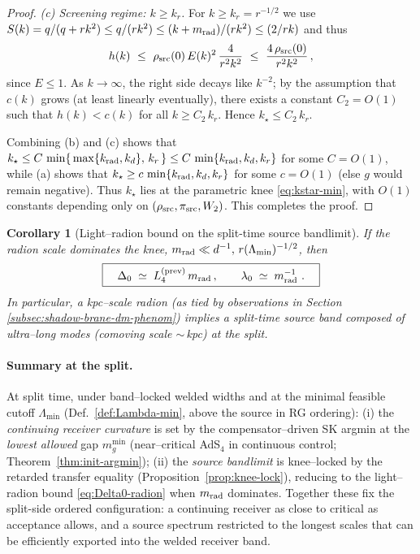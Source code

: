 \documentclass[10pt]{article}
\theoremstyle{definition}
\theoremstyle{plain}
\newtheorem{corollary}{Corollary}[section]
\begin{document}
\begin{proof}
\smallskip
\noindent\emph{(c) Screening regime: $k\ge k_r$.}
For $k\ge k_r=r^{-1/2}$ we use $S(k)=q/(q+rk^2)\le q/(rk^2)\le (k+m_{\rm rad})/(rk^2)\le (2/rk)$ and thus
\begin{equation}\label{eq:h-screen-decay}
h(k)\ \le\ \rho_{\rm src}(0)\,E(k)^2\,\frac{4}{r^2 k^2}\ \le\ \frac{4\,\rho_{\rm src}(0)}{r^2 k^2}\,,
\end{equation}
since $E\le 1$. As $k\to\infty$, the right side decays like $k^{-2}$; by the assumption that $c(k)$ grows (at least linearly eventually), there exists a constant $C_2=O(1)$ such that $h(k)<c(k)$ for all $k\ge C_2\,k_r$. Hence $k_\star\le C_2\,k_r$.

\smallskip
Combining (b) and (c) shows that $k_\star\le C\,\min\{\,\max\{k_{\rm rad},k_d\},\,k_r\,\}\le C\,\min\{k_{\rm rad},k_d,k_r\}$ for some $C=O(1)$, while (a) shows that $k_\star\ge c\,\min\{k_{\rm rad},k_d,k_r\}$ for some $c=O(1)$ (else $g$ would remain negative). Thus $k_\star$ lies at the parametric knee \eqref{eq:kstar-min}, with $O(1)$ constants depending only on $(\rho_{\rm src},\pi_{\rm src},W_2)$. This completes the proof.
\end{proof}

\begin{corollary}[Light--radion bound on the split-time source bandlimit]
\label{cor:light-radion}
If the radion scale dominates the knee, $m_{\rm rad}\ll d^{-1},\,r(\Lambda_{\min})^{-1/2}$, then
\begin{equation}
\label{eq:Delta0-radion}
\boxed{\quad \Delta_0\;\simeq\; L_4^{\rm(prev)}\,m_{\rm rad}\,,\qquad \lambda_0\;\simeq\; m_{\rm rad}^{-1}\ .\quad}
\end{equation}
In particular, a kpc--scale radion (as tied by observations in Section \ref{subsec:shadow-brane-dm-phenom}) implies a split-time source band composed of ultra--long modes
(comoving scale $\sim$\,kpc) at the split.
\end{corollary}

\paragraph{Summary at the split.}\label{par:uom-main-137}
At split time, under band--locked welded widths and at the minimal feasible cutoff
$\Lambda_{\min}$ (Def.~\ref{def:Lambda-min}, above the source in RG ordering):
(i) the \emph{continuing receiver curvature} is set by the compensator--driven SK argmin at the \emph{lowest allowed} gap
$m_g^{\min}$ (near--critical AdS$_4$ in continuous control; Theorem~\ref{thm:init-argmin});
(ii) the \emph{source bandlimit} is knee–locked by the retarded transfer equality (Proposition~\ref{prop:knee-lock}),
reducing to the light–radion bound \eqref{eq:Delta0-radion} when $m_{\rm rad}$ dominates. Together these
fix the split-side ordered configuration: a continuing receiver as close to critical as acceptance allows, and a source spectrum
restricted to the longest scales that can be efficiently exported into the welded receiver band.
\end{document}
